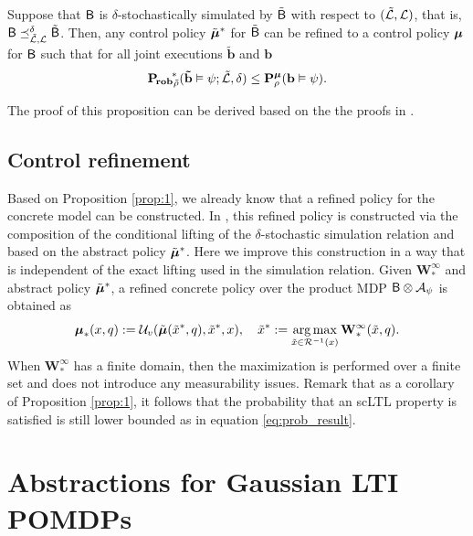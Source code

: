 \documentclass{ifacconf}
\begin{document}
\begin{prop}\label{prop:1}
  Suppose that $\mathsf{B}$ is $\delta$-stochastically simulated by $\tilde {\mathsf{B}}$ with respect to $({\tilde{\mathcal{L}},\mathcal{L}})$, that is, ${\mathsf{B}}\preceq^{\delta}_{\tilde{\mathcal{L}},\mathcal{L}} \tilde {\mathsf{B}}$. Then, any control policy ${\tilde {{\boldsymbol{\mu}}}}^\ast$ for $\tilde {\mathsf{B}}$ can be refined to a control policy ${\boldsymbol{\mu}}$ for $\mathsf{B}$ such that for all joint executions $\mathbf{\tilde b}$ and $\mathbf{b}$
  \begin{equation}
  \label{eq:prob_result}
    \mathbf{P_{\! rob}}_{\tilde {\rho}}^{\!\ast}(\mathbf{\tilde b} \vDash\psi; \tilde{\mathcal{L}},\delta)\leq  \mathbf P _{\rho}^{{\boldsymbol{\mu}}}( \mathbf{b} \vDash\psi).
  \end{equation}
\end{prop}

The proof of this proposition can be derived based on the the proofs in \citep{tech_report_TACAS}.


\subsection{Control refinement}
\label{sec:control}

Based on Proposition \ref{prop:1}, we already know that a refined policy for the concrete model can be constructed. In \cite{tech_report_TACAS}, this refined policy is constructed via the composition of the conditional lifting of the $\delta$-stochastic simulation relation and based on the abstract policy $\tilde  {{\boldsymbol{\mu}}}^\ast$. Here we improve this construction in a way that is independent of the exact lifting used in the simulation relation. Given $\mathbf{W}^\infty_\ast$ and abstract policy $\tilde {{\boldsymbol{\mu}}}^\ast$, a refined concrete policy over the product MDP $\mathsf{B}\otimes\mathcal{A}_\psi$ is obtained as
\begin{equation*}
		{\boldsymbol{\mu}}_\ast(x,q): = \mathcal{U}_{v}( \tilde{{\boldsymbol{\mu}}}(\tilde x^*, q), \tilde x^*, x), \quad \tilde x^*:=\operatorname*{arg\,max}_{ \tilde x\in
		\mathcal{R}^{-1}(x)} \mathbf  W^\infty_\ast(\tilde x,q).
\end{equation*}
When  $\mathbf  W^\infty_\ast$ has a finite domain, then the maximization is performed over a finite set and does not introduce any measurability issues.
Remark that as a corollary of Proposition \ref{prop:1}, it follows that the probability that an scLTL property is satisfied is still lower bounded as in equation \eqref{eq:prob_result}.


\section{Abstractions for Gaussian LTI POMDPs}
\label{sec:gaussian}
\end{document}
